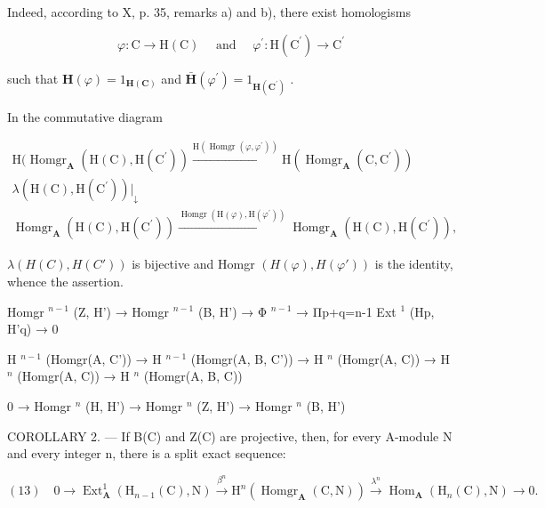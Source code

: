 Indeed, according to X, p. 35, remarks a) and b), there exist homologisms

\[
\varphi : \mathrm{C} \rightarrow \mathrm{H} (\mathrm{C}) \quad \text { and } \quad \varphi^ {\prime}: \mathrm{H} (\mathrm{C} ^ {\prime}) \rightarrow \mathrm{C} ^ {\prime}
\]

such that \(\mathbf{H}(\varphi) = 1_{\mathbf{H}(\mathbf{C})}\) and \(\bar{\mathbf{H}} (\varphi^{\prime}) = 1_{\mathbf{H}(\mathbf{C}^{\prime})}\) .

In the commutative diagram

\[
\begin{array}{l} \mathrm{H} (\operatorname{Homgr} _ {\mathbf {A}} (\mathrm{H} (\mathrm{C}), \mathrm{H} (\mathrm{C} ^ {\prime})) \xrightarrow {\mathrm{H} (\operatorname{Homgr} (\varphi , \varphi^ {\prime}))} \mathrm{H} (\operatorname{Homgr} _ {\mathbf {A}} (\mathrm{C}, \mathrm{C} ^ {\prime})) \\ \lambda (\mathrm{H} (\mathrm{C}), \mathrm{H} (\mathrm{C} ^ {\prime})) \Big | _ {\downarrow} \\ \operatorname{Homgr} _ {\mathbf {A}} (\mathrm{H} (\mathrm{C}), \mathrm{H} (\mathrm{C} ^ {\prime})) \xrightarrow {\operatorname{Homgr} (\mathrm{H} (\varphi) , \mathrm{H} (\varphi^ {\prime}))} \operatorname{Homgr} _ {\mathbf {A}} (\mathrm{H} (\mathrm{C}), \mathrm{H} (\mathrm{C} ^ {\prime}))  , \end{array}
\]

\(\lambda(H(C), H(C'))\) is bijective and Homgr \((H(\varphi), H(\varphi'))\) is the identity, whence the assertion.

Homgr \(^{n-1}\) (Z, H') → Homgr \(^{n-1}\) (B, H') → Φ \(^{n-1}\) → Πp+q=n-1 Ext \(^{1}\) (Hp, H'q) → 0

H \(^{n-1}\) (Homgr(A, C')) → H \(^{n-1}\) (Homgr(A, B, C')) → H \(^{n}\) (Homgr(A, C)) → H \(^{n}\) (Homgr(A, C)) → H \(^{n}\) (Homgr(A, B, C))

0 → Homgr \(^{n}\) (H, H') → Homgr \(^{n}\) (Z, H') → Homgr \(^{n}\) (B, H')

COROLLARY 2. --- If B(C) and Z(C) are projective, then, for every A-module N and every integer n, there is a split exact sequence:

\[
(1 3) \quad 0 \longrightarrow \operatorname{Ext} _ {\mathbf {A}} ^ {1} \left(\mathrm{H} _ {n - 1} (\mathrm{C}), \mathrm{N}\right) \xrightarrow {\beta^ {n}} \mathrm{H} ^ {n} \left(\operatorname{Homgr} _ {\mathbf {A}} (\mathrm{C}, \mathrm{N})\right) \xrightarrow {\lambda^ {n}} \operatorname{Hom} _ {\mathbf {A}} \left(\mathrm{H} _ {n} (\mathrm{C}), \mathrm{N}\right) \longrightarrow 0.
\]

